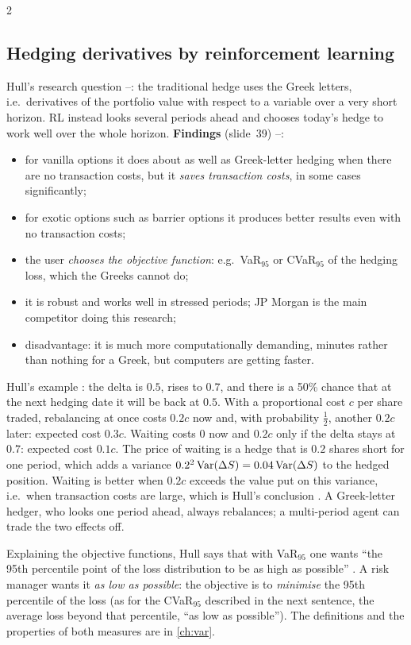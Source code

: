 \begin{paracol}{2}
\subsection{Hedging derivatives by reinforcement learning}
Hull's research question --: the traditional hedge uses the Greek letters, i.e.\ derivatives of the portfolio value with respect to a variable over a very short horizon. RL instead looks several periods ahead and chooses today's hedge to work well over the whole
horizon. \textbf{Findings} (slide~39) --:
\begin{itemize}
  \item for vanilla options it does about as well as Greek-letter hedging when there are no transaction costs, but it \emph{saves transaction costs}, in some cases significantly;
  \item for exotic options such as barrier options it produces better results even with no transaction costs;
  \item the user \emph{chooses the objective function}: e.g.\ VaR$_{95}$ or CVaR$_{95}$ of the hedging loss, which the Greeks cannot do;
  \item it is robust and works well in stressed periods; JP Morgan is the main competitor doing this research;
  \item disadvantage: it is much more computationally demanding, minutes rather than nothing for a Greek, but computers are getting faster.
\end{itemize}
\begin{intuition}
Hull's example : the delta is $0.5$, rises to $0.7$, and there is a 50\% chance that at the next hedging date it will be back at $0.5$. With a proportional cost $c$ per share traded, rebalancing at once costs $0.2c$ now and, with probability $\tfrac12$, another $0.2c$
later: expected cost $0.3c$. Waiting costs $0$ now and $0.2c$ only if the delta stays at $0.7$: expected cost $0.1c$. The price of waiting is a hedge that is $0.2$ shares short for one period, which adds a variance $0.2^2\operatorname{Var}(\Delta S)=0.04\operatorname{Var}(\Delta S)$ to the hedged position. Waiting is better
when $0.2c$ exceeds the value put on this variance, i.e.\ when transaction costs are large, which is Hull's conclusion . A Greek-letter hedger, who looks one period ahead, always rebalances; a multi-period agent can trade the two effects off.
\end{intuition}
\begin{coursenote}
Explaining the objective functions, Hull says that with VaR$_{95}$ one wants ``the 95th percentile point of the loss distribution to be as high as possible'' . A risk manager wants it \emph{as low as possible}: the objective is to \emph{minimise} the
95th percentile of the loss (as for the CVaR$_{95}$ described in the next sentence, the average loss beyond that percentile, ``as low as possible''). The definitions and the properties of both measures are in \cref{ch:var}.
\end{coursenote}


\end{paracol}
